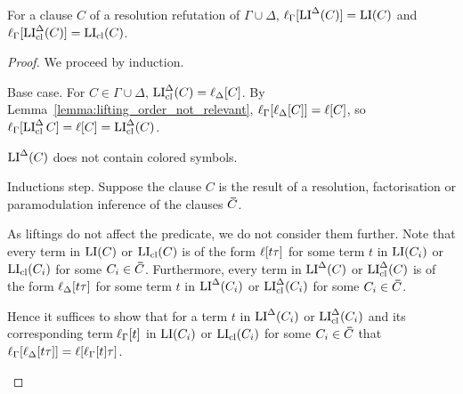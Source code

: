 \documentclass[,%
	draft=false,%
	numbers=noendperiod
	11pt,
	a4paper,
	oneside,%
	openany,
]{memoir}
\begin{document}
\begin{lemma}
	\label{old:lemma:gamma_lifted_lide}
	For a clause $C$ of a resolution refutation of $\Gamma\cup\Delta$, 
	$\ell_{\Gamma}[\operatorname{LI}^\Delta(C)] = \operatorname{LI}(C)$ and $\ell_{\Gamma}[\operatorname{LI}_{\operatorname{cl}}^\Delta(C)] = \operatorname{LI}_{\operatorname{cl}}(C)$.
\end{lemma}
\begin{proof}
	We proceed by induction.
	\begin{description}
		\item{} Base case.
			For $C \in \Gamma\cup\Delta$, $\operatorname{LI}_{\operatorname{cl}}^\Delta(C) = \ell_{\Delta}[C]$.
			By Lemma~\ref{lemma:lifting_order_not_relevant}, $\ell_{\Gamma}[\ell_{\Delta}[C]] = \ell[C]$,
			so $\ell_{\Gamma}[\operatorname{LI}_{\operatorname{cl}}^\Delta{C}] = \ell[C] = \operatorname{LI}_{\operatorname{cl}}^\Delta(C)$.

			$\operatorname{LI}^\Delta(C)$ does not contain colored symbols.

		\item{} Inductions step.
			Suppose the clause $C$ is the result of a resolution, factorisation or paramodulation inference \inference{} of the clauses $\bm\bar C$.


			As liftings do not affect the predicate, we do not consider them further.
			Note that every term in $\operatorname{LI}(C)$ or $\operatorname{LI}_{\operatorname{cl}}(C)$ is of the form $\ell[t\tau]$ for some term $t$ in $\operatorname{LI}(C_i)$ or $\operatorname{LI}_{\operatorname{cl}}(C_i)$ for some $C_i \in \bm\bar C$.
			Furthermore,
			every term in $\operatorname{LI}^\Delta(C)$ or $\operatorname{LI}_{\operatorname{cl}}^\Delta(C)$ is of the form $\ell_{\Delta}[t\tau]$ for some term $t$ in $\operatorname{LI}^\Delta(C_i)$ or $\operatorname{LI}_{\operatorname{cl}}^\Delta(C_i)$ for some $C_i \in \bm\bar C$.



			Hence it suffices to show that for a term $t$ in $\operatorname{LI}^\Delta(C_i)$ or $\operatorname{LI}_{\operatorname{cl}}^\Delta(C_i)$ and its corresponding term $\ell_{\Gamma}[t]$ in $\operatorname{LI}(C_i)$ or $\operatorname{LI}_{\operatorname{cl}}(C_i)$ for some $C_i \in \bm\bar C$
			that $\ell_{\Gamma}[ \ell_{\Delta}[t\tau] ] = \ell[\ell_{\Gamma}[t]\tau]$.


\end{description}
\end{proof}
\end{document}
